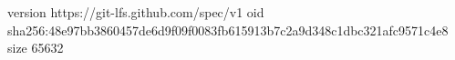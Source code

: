 version https://git-lfs.github.com/spec/v1
oid sha256:48e97bb3860457de6d9f09f0083fb615913b7c2a9d348c1dbc321afc9571c4e8
size 65632
